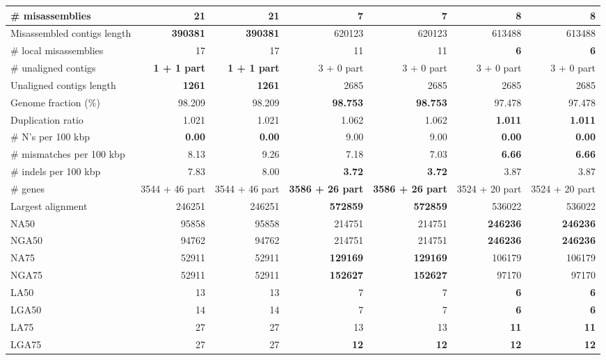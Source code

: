 \documentclass[12pt,a4paper]{article}
\begin{document}
\begin{table}[ht]
\begin{center}
\begin{tabular}{|l*{6}{|r}|}
\# misassemblies & 21 & 21 & {\bf 7} & {\bf 7} & 8 & 8 \\ \hline
Misassembled contigs length & {\bf 390381} & {\bf 390381} & 620123 & 620123 & 613488 & 613488 \\ \hline
\# local misassemblies & 17 & 17 & 11 & 11 & {\bf 6} & {\bf 6} \\ \hline
\# unaligned contigs & {\bf 1 + 1 part} & {\bf 1 + 1 part} & 3 + 0 part & 3 + 0 part & 3 + 0 part & 3 + 0 part \\ \hline
Unaligned contigs length & {\bf 1261} & {\bf 1261} & 2685 & 2685 & 2685 & 2685 \\ \hline
Genome fraction (\%) & 98.209 & 98.209 & {\bf 98.753} & {\bf 98.753} & 97.478 & 97.478 \\ \hline
Duplication ratio & 1.021 & 1.021 & 1.062 & 1.062 & {\bf 1.011} & {\bf 1.011} \\ \hline
\# N's per 100 kbp & {\bf 0.00} & {\bf 0.00} & 9.00 & 9.00 & {\bf 0.00} & {\bf 0.00} \\ \hline
\# mismatches per 100 kbp & 8.13 & 9.26 & 7.18 & 7.03 & {\bf 6.66} & {\bf 6.66} \\ \hline
\# indels per 100 kbp & 7.83 & 8.00 & {\bf 3.72} & {\bf 3.72} & 3.87 & 3.87 \\ \hline
\# genes & 3544 + 46 part & 3544 + 46 part & {\bf 3586 + 26 part} & {\bf 3586 + 26 part} & 3524 + 20 part & 3524 + 20 part \\ \hline
Largest alignment & 246251 & 246251 & {\bf 572859} & {\bf 572859} & 536022 & 536022 \\ \hline
NA50 & 95858 & 95858 & 214751 & 214751 & {\bf 246236} & {\bf 246236} \\ \hline
NGA50 & 94762 & 94762 & 214751 & 214751 & {\bf 246236} & {\bf 246236} \\ \hline
NA75 & 52911 & 52911 & {\bf 129169} & {\bf 129169} & 106179 & 106179 \\ \hline
NGA75 & 52911 & 52911 & {\bf 152627} & {\bf 152627} & 97170 & 97170 \\ \hline
LA50 & 13 & 13 & 7 & 7 & {\bf 6} & {\bf 6} \\ \hline
LGA50 & 14 & 14 & 7 & 7 & {\bf 6} & {\bf 6} \\ \hline
LA75 & 27 & 27 & 13 & 13 & {\bf 11} & {\bf 11} \\ \hline
LGA75 & 27 & 27 & {\bf 12} & {\bf 12} & {\bf 12} & {\bf 12} \\ \hline
\end{tabular}
\end{center}
\end{table}
\end{document}
